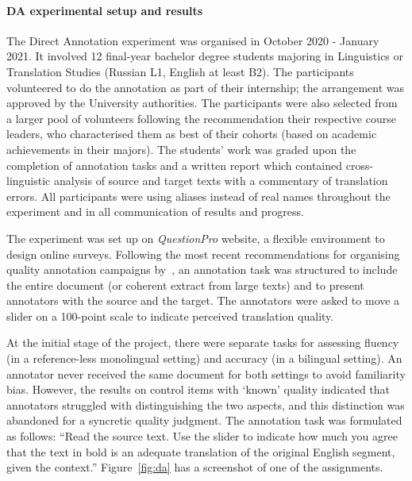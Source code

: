 \paragraph{DA experimental setup and results} 
The Direct Annotation experiment was organised in October 2020 - January 2021. It involved 12 final-year bachelor degree students majoring in Linguistics or Translation Studies (Russian L1, English at least B2). The participants volunteered to do the annotation as part of their internship; the arrangement was approved by the University authorities. The participants were also selected from a larger pool of volunteers following the recommendation their respective course leaders, who characterised them as best of their cohorts (based on academic achievements in their majors). 
The students' work was graded upon the completion of annotation tasks and a written report which contained cross-linguistic analysis of source and target texts with a commentary of translation errors. All participants were using aliases instead of real names throughout the experiment and in all communication of results and progress. 

The experiment was set up on \textit{QuestionPro} website, a flexible environment to design online surveys. Following the most recent recommendations for organising quality annotation campaigns by~\citet{Laubli2020}, an annotation task was structured to include the entire document (or coherent extract from large texts) and to present annotators with the source and the target. The annotators were asked to move a slider on a 100-point scale to indicate perceived translation quality.

At the initial stage of the project, there were separate tasks for assessing fluency (in a reference-less monolingual setting) and accuracy (in a bilingual setting). An annotator never received the same document for both settings to avoid familiarity bias. However, the results on control items with `known' quality indicated that annotators struggled with distinguishing the two aspects, and this distinction was abandoned for a syncretic quality judgment. The annotation task was formulated as follows: ``Read the source text. Use the slider to indicate how much you agree that the text in bold is an adequate translation of the original English segment, given the context.'' Figure~\ref{fig:da} has a screenshot of one of the assignments.

